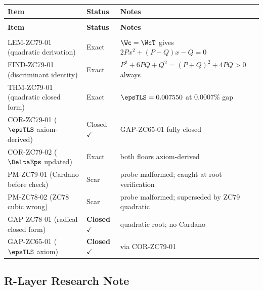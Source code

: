 \documentclass[12pt, a4paper]{article}
\begin{document}
{\small
\setlength{\LTpre}{4pt}\setlength{\LTpost}{4pt}
\renewcommand{\arraystretch}{1.30}
\begin{longtable}{>{\raggedright\arraybackslash}p{5.0cm}
                  >{\centering\arraybackslash}p{2.5cm}
                  >{\raggedright\arraybackslash}p{5.0cm}}
\toprule
\textbf{Item} & \textbf{Status} & \textbf{Notes} \\
\midrule
\endfirsthead
\multicolumn{3}{l}{\small\textit{(continued)}}\\[4pt]
\toprule\textbf{Item}&\textbf{Status}&\textbf{Notes}\\\midrule
\endhead
\midrule\multicolumn{3}{r}{\small\textit{(continues)}}\\
\endfoot
\bottomrule
\endlastfoot
LEM-ZC79-01 (quadratic derivation)
  & Exact & $\Wc=\WcT$ gives $2Px^2+(P-Q)x-Q=0$ \\[4pt]
FIND-ZC79-01 (discriminant identity)
  & Exact & $P^2+6PQ+Q^2=(P+Q)^2+4PQ>0$ always \\[4pt]
THM-ZC79-01 (quadratic closed form)
  & Exact & $\epsTLS = 0.007550$ at $0.0007\%$ gap \\[4pt]
COR-ZC79-01 ($\epsTLS$ axiom-derived)
  & Closed $\checkmark$ & GAP-ZC65-01 fully closed \\[4pt]
COR-ZC79-02 ($\DeltaEps$ updated)
  & Exact & both floors axiom-derived \\[4pt]
PM-ZC79-01 (Cardano before check)
  & Scar & probe malformed; caught at root verification \\[4pt]
PM-ZC78-02 (ZC78 cubic wrong)
  & Scar & probe malformed; superseded by ZC79 quadratic \\[4pt]
\midrule
GAP-ZC78-01 (radical closed form)
  & \textbf{Closed} $\checkmark$ & quadratic root; no Cardano \\[4pt]
GAP-ZC65-01 ($\epsTLS$ axiom)
  & \textbf{Closed} $\checkmark$ & via COR-ZC79-01 \\
\bottomrule
\end{longtable}
}

\subsection{R-Layer Research Note}
\label{sec:rlayer}
\end{document}
